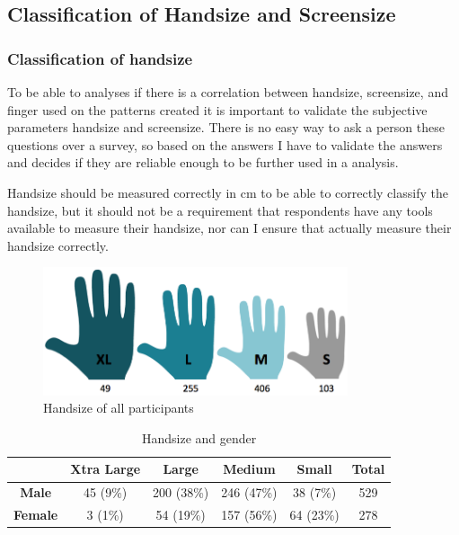  \subsection{Classification of Handsize and Screensize} \label{sec:classificationhandsizescreensize}

    \subsubsection*{Classification of handsize}
    To be able to analyses if there is a correlation between handsize, screensize, and finger used on the patterns created it is important to validate the subjective parameters handsize and screensize. There is no easy way to ask a person these questions over a survey, so based on the answers I have to validate the answers and decides if they are reliable enough to be further used in a analysis. 

    Handsize should be measured correctly in cm to be able to correctly classify the handsize, but it should not be a requirement that respondents have any tools available to measure their handsize, nor can I ensure that actually measure their handsize correctly. 


		\begin{figure}[H]
      \centering
      \includegraphics[width=0.8\textwidth]{pics/analysis/handsize.png}
      \caption{Handsize of all participants}
      \label{fig:handsize}
    \end{figure}

    \begin{table}[H]
      \centering
      \begin{tabular}{ c || c | c | c | c || c }
        \hline
        & {\bf Xtra Large} & {\bf Large} & {\bf Medium} & {\bf Small} & {\bf Total}\\ \hline
        {\bf Male} & 45 (9\%) & 200 (38\%) & 246 (47\%) & 38 (7\%) & 529 \\
        {\bf Female} & 3 (1\%) & 54 (19\%) & 157 (56\%) & 64 (23\%) & 278 \\ \hline
      \end{tabular}
      \caption{Handsize and gender}
      \label{tab:HandsizeGender}
    \end{table}

